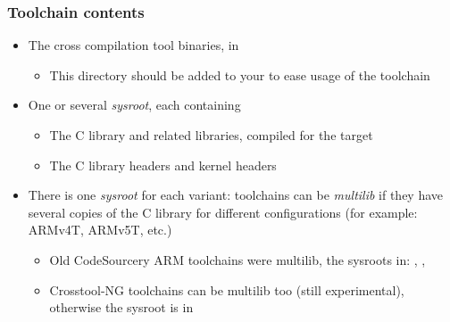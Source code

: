 \begin{frame}
  \frametitle{Toolchain contents}
  \begin{itemize}
  \item The cross compilation tool binaries, in 
    \begin{itemize}
    \item This directory should be added to your  to ease
      usage of the toolchain
    \end{itemize}
  \item One or several {\em sysroot}, each containing
    \begin{itemize}
    \item The C library and related libraries, compiled for the target
    \item The C library headers and kernel headers
    \end{itemize}
  \item There is one {\em sysroot} for each variant: toolchains can be
    {\em multilib} if they have several copies of the C library for
    different configurations (for example: ARMv4T, ARMv5T, etc.)
    \begin{itemize}
    \item Old CodeSourcery ARM toolchains were multilib, the sysroots in:
      ,
      ,
    \item Crosstool-NG toolchains can be multilib too (still
          experimental), otherwise the sysroot is
      in 
    \end{itemize}
  \end{itemize}
\end{frame}

